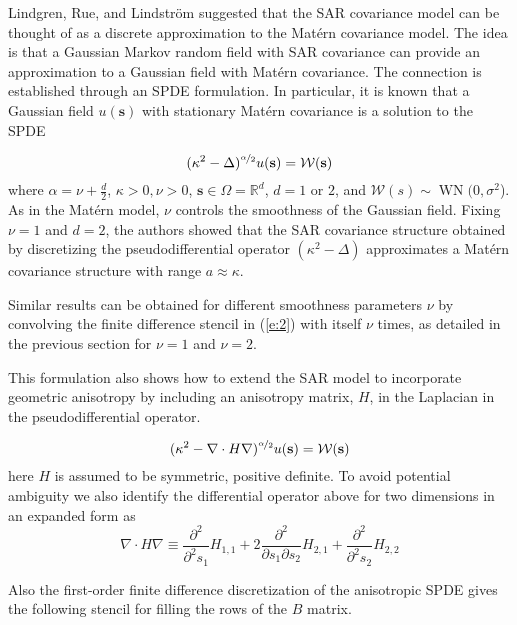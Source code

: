 \documentclass[review]{elsarticle}
\begin{document}
Lindgren, Rue, and Lindstr{\"o}m \cite{lindgren2011explicit} suggested that the SAR covariance model can be thought of as a discrete approximation to the Mat\'ern covariance model. The idea is that a Gaussian Markov random field with SAR covariance can provide an approximation to a Gaussian field with Mat\'ern covariance. The connection is established through an SPDE formulation. In particular, it is known that a Gaussian field $u(\mathbf s)$ with stationary Mat\'ern covariance is a solution to the SPDE

$$ (\kappa^2 - \Delta)^{\nicefrac{\alpha}{2}} u(\mathbf s) = \mathcal{W}(\mathbf s) $$
where $\alpha = \nu + \frac{d}{2}$, $\kappa > 0, \nu > 0$, $\mathbf s \in \Omega = \mathbb{R}^d$, $d = 1$ or $2$, and $\mathcal{W}(s) \sim \operatorname{WN}(0, \sigma^2$). As in the Mat\'ern model, $\nu$ controls the smoothness of the Gaussian field. Fixing $\nu = 1$ and $d = 2$, the authors showed that the SAR covariance structure obtained by discretizing the pseudodifferential operator $(\kappa^2 - \Delta)$ approximates a Mat\'ern covariance structure with range $a \approx \kappa$. 

Similar results can be obtained for different smoothness parameters $\nu$ by convolving the finite difference stencil in (\ref{e:2}) with itself $\nu$ times, as detailed in the previous section for $\nu=1$ and $\nu=2$.

This formulation also shows how to extend the SAR model to incorporate geometric anisotropy by including an anisotropy matrix, $H$, in the Laplacian in the pseudodifferential operator.

\begin{equation}
\label{SPDE}
 (\kappa^2 - \nabla \cdot H \nabla)^{\nicefrac{\alpha}{2}} u(\mathbf s) = \mathcal{W}(\mathbf s) 
 \end{equation} 
here $H$ is assumed to be symmetric, positive definite. 
 To avoid potential ambiguity we also identify  the differential operator above  for two dimensions  in an expanded form as 
\[  \nabla \cdot H \nabla  \equiv  \frac{\partial^2}{\partial^2 s_1}H_{1,1} +  2 \frac{\partial^2}{\partial s_1 \partial s_2}H_{2,1} + \frac{\partial^2}{\partial^2 s_2}H_{2,2} \]

Also the first-order finite difference discretization of the anisotropic SPDE gives the following stencil for filling the rows of the $B$ matrix.
\end{document}
